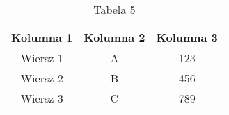 \begin{table}
    \centering
    \begin{tabular}{|c|c|c|}
        \hline
        Kolumna 1 & Kolumna 2 & Kolumna 3 \\
        \hline
        Wiersz 1 & A & 123 \\
        Wiersz 2 & B & 456 \\
        Wiersz 3 & C & 789 \\
        \hline
    \end{tabular}
    \caption{Tabela 5}
    \label{tab:table5}
\end{table}
